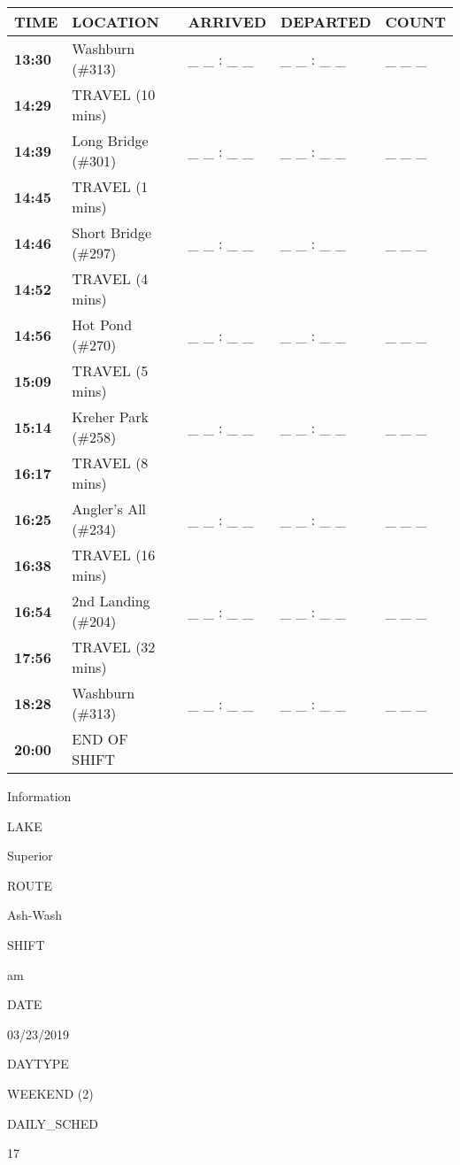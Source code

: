 \documentclass[]{article}
\begin{document}
\begin{tabular}{>{\bfseries}lllll}
\toprule
\textbf{TIME} & \textbf{LOCATION} & \textbf{ARRIVED} & \textbf{DEPARTED} & \textbf{COUNT}\\
\midrule
13:30 & Washburn (\#313) & \_ \_ : \_ \_ & \_ \_ : \_ \_ & \_ \_ \_\\
14:29 & TRAVEL (10 mins) &  &  & \\
14:39 & Long Bridge (\#301) & \_ \_ : \_ \_ & \_ \_ : \_ \_ & \_ \_ \_\\
14:45 & TRAVEL (1 mins) &  &  & \\
14:46 & Short Bridge (\#297) & \_ \_ : \_ \_ & \_ \_ : \_ \_ & \_ \_ \_\\
14:52 & TRAVEL (4 mins) &  &  & \\
14:56 & Hot Pond (\#270) & \_ \_ : \_ \_ & \_ \_ : \_ \_ & \_ \_ \_\\
15:09 & TRAVEL (5 mins) &  &  & \\
15:14 & Kreher Park (\#258) & \_ \_ : \_ \_ & \_ \_ : \_ \_ & \_ \_ \_\\
16:17 & TRAVEL (8 mins) &  &  & \\
16:25 & Angler's All (\#234) & \_ \_ : \_ \_ & \_ \_ : \_ \_ & \_ \_ \_\\
16:38 & TRAVEL (16 mins) &  &  & \\
16:54 & 2nd Landing (\#204) & \_ \_ : \_ \_ & \_ \_ : \_ \_ & \_ \_ \_\\
17:56 & TRAVEL (32 mins) &  &  & \\
18:28 & Washburn (\#313) & \_ \_ : \_ \_ & \_ \_ : \_ \_ & \_ \_ \_\\
20:00 & END OF SHIFT &  &  & \\
\bottomrule
\end{tabular}\newpage

Information

LAKE

Superior

ROUTE

Ash-Wash

SHIFT

am

DATE

03/23/2019

DAYTYPE

WEEKEND (2)

DAILY\_SCHED

17

\vspace{24pt}
\end{document}
